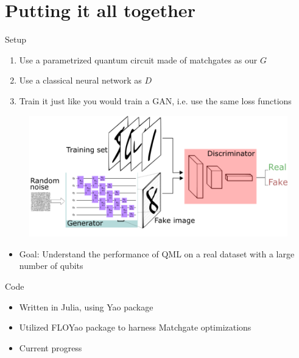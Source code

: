 \documentclass[xcolor=dvipsnames]{beamer}
\begin{document}
\section{Putting it all together}

\begin{frame}{Setup}
  \begin{enumerate}
    \item Use a parametrized quantum circuit made of matchgates as our $G$
    \item Use a classical neural network as $D$
    \item Train it just like you would train a GAN, i.e. use the same loss functions
  \end{enumerate}
  \begin{figure}
    \centering
    \includegraphics[width=0.7 \textwidth]{setup.png}
  \end{figure}
  \begin{itemize}
    \item Goal: Understand the performance of QML on a real dataset with a large number of qubits
  \end{itemize}
\end{frame}

\begin{frame}{Code}
  \begin{itemize}
    \item Written in Julia, using Yao package
    \item Utilized FLOYao package to harness Matchgate optimizations
    \item Current progress
  \end{itemize}
\end{frame}
\end{document}
